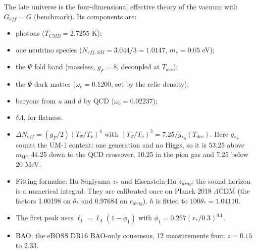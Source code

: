 \documentclass[11pt]{article}
\begin{document}
The late universe is the four-dimensional effective theory of the vacuum with $G_{eff} = G$ (benchmark). Its components are:
\begin{itemize}
\item photons ($T_{CMB} = 2.7255$ K);
\item one neutrino species ($N_{eff,SM} = 3.044/3 = 1.0147$, $m_\nu = 0.05$ eV);
\item the $\Psi$ fold band (massless, $g_F = 8$, decoupled at $T_{dec}$);
\item the $\Psi$ dark matter ($\omega_c = 0.1200$, set by the relic density);
\item baryons from $u$ and $d$ by QCD ($\omega_b = 0.02237$);
\item $\delta\Lambda$, for flatness.
\item $\Delta N_{eff} = (g_F/2)(T_\Psi/T_\nu)^4$ with $(T_\Psi/T_\nu)^3 = 7.25/g_{*s}(T_{dec})$. Here $g_{*s}$ counts the UM-1 content: one generation and no Higgs, so it is 53.25 above $m_W$, 44.25 down to the QCD crossover, 10.25 in the pion gas and 7.25 below 20 MeV.
\item Fitting formulae: Hu-Sugiyama $z_*$ and Eisenstein-Hu $z_{drag}$; the sound horizon is a numerical integral. They are calibrated once on Planck 2018 $\Lambda$CDM (the factors 1.00198 on $\theta_*$ and 0.97684 on $r_{drag}$). $h$ is fitted to $100\theta_* = 1.04110$.
\item The first peak uses $\ell_1 = \ell_A(1 - \phi_1)$ with $\phi_1 = 0.267(r_*/0.3)^{0.1}$.
\item BAO: the eBOSS DR16 BAO-only consensus, 12 measurements from $z = 0.15$ to $2.33$.
\end{itemize}
\end{document}
